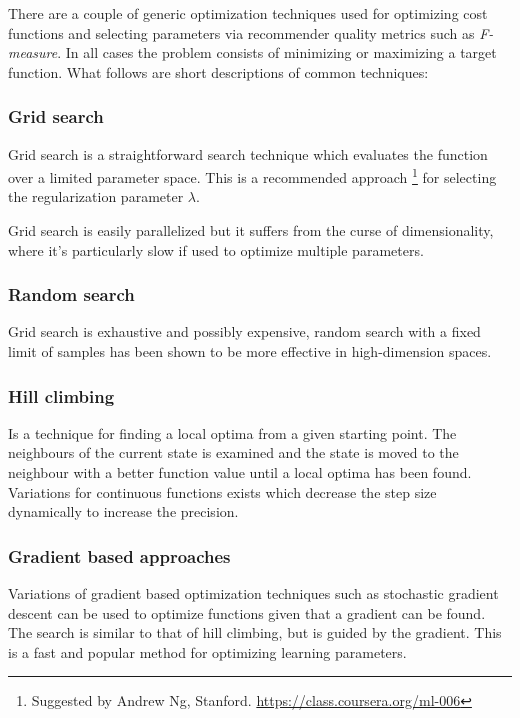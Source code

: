 There are a couple of generic optimization techniques used for optimizing cost functions and selecting parameters via recommender quality metrics such as \textit{F-measure}. In all cases the problem consists of minimizing or maximizing a target function. What follows are short descriptions of common techniques:


\subsubsection{Grid search}

Grid search is a straightforward search technique which evaluates the function over a limited parameter space. This is a recommended approach
\footnote{Suggested by Andrew Ng, Stanford. \url{https://class.coursera.org/ml-006}}
for selecting the regularization parameter $\lambda$.

Grid search is easily parallelized but it suffers from the curse of dimensionality, where it's particularly slow if used to optimize multiple parameters.


\subsubsection{Random search}

Grid search is exhaustive and possibly expensive, random search with a fixed limit of samples has been shown to be more effective in high-dimension spaces. \citep{bergstra2012random}


\subsubsection{Hill climbing}

Is a technique for finding a local optima from a given starting point. The neighbours of the current state is examined and the state is moved to the neighbour with a better function value until a local optima has been found. Variations for continuous functions exists which decrease the step size dynamically to increase the precision.


\subsubsection{Gradient based approaches}

Variations of gradient based optimization techniques such as stochastic gradient descent can be used to optimize functions given that a gradient can be found. The search is similar to that of hill climbing, but is guided by the gradient.  This is a fast and popular method for optimizing learning parameters.
\cite{hu2008collaborative}


